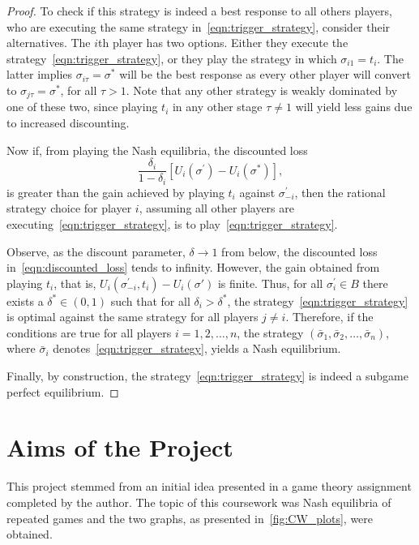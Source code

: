 \begin{proof}
    To check if this strategy is indeed a best response to all others players,
    who are executing the same strategy in~\eqref{eqn:trigger_strategy},
    consider their alternatives. The \(i\)th player has two options. Either
    they execute the strategy~\eqref{eqn:trigger_strategy}, or they play the
    strategy in which \(\sigma_{i1} = t_{i}\). The latter implies \(\sigma_{i\tau} =
    \sigma^{*}\) will be the best response as every other player will convert
    to \(\sigma_{j\tau} = \sigma^{*}\), for all \(\tau > 1\). Note that any
    other strategy is weakly dominated by one of these two, since playing
    \(t_{i}\) in any other stage \(\tau \ne 1\) will yield less gains due to increased discounting.

    Now if, from playing the Nash equilibria, the discounted loss 
    \begin{equation}
        \frac{\delta_{i}}{1-\delta_{i}}[U_{i}(\sigma^{\prime}) -
        U_{i}(\sigma^{*})],
    \end{equation}\label{eqn:discounted_loss}
    is greater than the gain achieved by playing
    \(t_{i}\) against \(\sigma_{-i}^{\prime}\), then the rational
    strategy choice for player \(i\), assuming all other players are
    executing~\eqref{eqn:trigger_strategy}, is to play~\eqref{eqn:trigger_strategy}.
    
    Observe, as the discount parameter, \(\delta \to 1\) from
    below, the discounted loss in~\eqref{eqn:discounted_loss} tends to infinity.
    However, the gain obtained from playing \(t_{i}\), that is,
    \(U_{i}(\sigma_{-i}^{\prime}, t_{i}) - U_{i}(\sigma{\prime})\) is finite.
    Thus, for all \(\sigma_{i}^{\prime} \in B\) there exists a \(\delta^{*} \in
    (0, 1)\) such that for all \(\delta_{i} > \delta^{*}\), the
    strategy~\eqref{eqn:trigger_strategy} is optimal against the same strategy
    for all players \(j \ne i\). Therefore, if the conditions are true for all
    players \(i = 1,2,\ldots,n\), the strategy \((\bar{\sigma}_{1},
    \bar{\sigma}_{2}, \ldots, \bar{\sigma}_{n})\), where  \(\bar{\sigma}_{i}\)
    denotes~\eqref{eqn:trigger_strategy}, yields a Nash equilibrium.

    Finally, by construction, the strategy~\eqref{eqn:trigger_strategy} is
    indeed a subgame perfect equilibrium. 
\end{proof}


\section{Aims of the Project}\label{sec:Aims_of_the_Project}
This project stemmed from an initial idea presented in a game theory assignment
completed by the author. The topic of this coursework was Nash equilibria of
repeated games and the two graphs, as presented in~\autoref{fig:CW_plots}, were
obtained.

